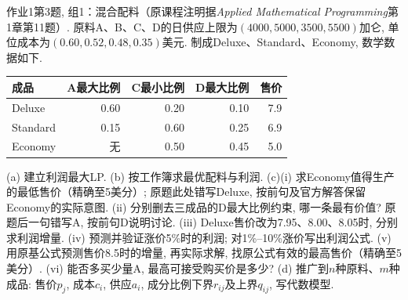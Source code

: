 \begin{exercise}\label{ass:15053-ps1-q3-g1}
作业1第3题, 组1：混合配料（原课程注明据\emph{Applied Mathematical Programming}第1章第11题）. 原料A、B、C、D的日供应上限为$(4000,5000,3500,5500)$加仑, 单位成本为$(0.60,0.52,0.48,0.35)$美元. 制成Deluxe、Standard、Economy, 数学数据如下.
\begin{center}\begin{tabular}{lrrrr}\toprule
成品&A最大比例&C最小比例&D最大比例&售价\\\midrule
Deluxe&0.60&0.20&0.10&7.9\\
Standard&0.15&0.60&0.25&6.9\\
Economy&无&0.50&0.45&5.0\\\bottomrule
\end{tabular}\end{center}
(a) 建立利润最大LP. (b) 按工作簿求最优配料与利润. (c)(i) 求Economy值得生产的最低售价（精确至5美分）; 原题此处错写Deluxe, 按前句及官方解答保留Economy的实际意图. (ii) 分别删去三成品的D最大比例约束, 哪一条最有价值? 原题后一句错写A, 按前句D说明讨论. (iii) Deluxe售价改为7.95、8.00、8.05时, 分别求利润增量. (iv) 预测并验证涨价5\%时的利润; 对1\%--10\%涨价写出利润公式. (v) 用原基公式预测售价8.5时的增量, 再实际求解, 找原公式有效的最高售价（精确至5美分）. (vi) 能否多买少量A, 最高可接受购买价是多少? (d) 推广到$n$种原料、$m$种成品: 售价$p_j$, 成本$c_i$, 供应$a_i$, 成分比例下界$r_{ij}$及上界$q_{ij}$, 写代数模型.
\end{exercise}
